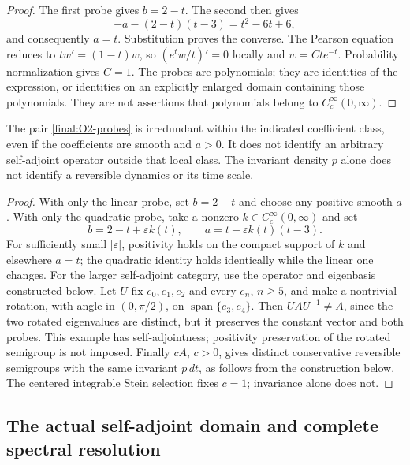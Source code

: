 \begin{proof}
The first probe gives $b=2-t$.  The second then gives
\[
 -a-(2-t)(t-3)=t^2-6t+6,
\]
and consequently $a=t$.  Substitution proves the converse.
The Pearson equation reduces to
$tw'=(1-t)w$, so $(e^t w/t)'=0$ locally and $w=Cte^{-t}$.
Probability normalization gives $C=1$.
The probes are polynomials; they are identities of the expression,
or identities on an explicitly enlarged domain containing those
polynomials.  They are not assertions that polynomials belong to
$C_c^\infty(0,\infty)$.
\end{proof}

\begin{proposition}
\label{final:O2-boundaries}
The pair \eqref{final:O2-probes} is irredundant within the indicated
coefficient class, even if the coefficients are smooth and $a>0$.
It does not identify an arbitrary self-adjoint operator outside that
local class.  The invariant density $p$ alone does not identify a
reversible dynamics or its time scale.
\end{proposition}

\begin{proof}
With only the linear probe, set $b=2-t$ and choose any positive smooth
$a$.  With only the quadratic probe, take a nonzero
$k\in C_c^\infty(0,\infty)$ and set
\[
 b=2-t+\varepsilon k(t),\qquad
 a=t-\varepsilon k(t)(t-3).
\]
For sufficiently small $|\varepsilon|$, positivity holds on the compact
support of $k$ and elsewhere $a=t$; the quadratic identity holds
identically while the linear one changes.
For the larger self-adjoint category, use the operator and eigenbasis
constructed below.  Let $U$ fix $e_0,e_1,e_2$ and every $e_n$, $n\geq5$,
and make a nontrivial rotation, with angle in $(0,\pi/2)$, on
$\operatorname{span}\{e_3,e_4\}$.  Then $UAU^{-1}\ne A$, since the
two rotated eigenvalues are distinct, but it preserves the constant
vector and both probes.  This example has self-adjointness; positivity
preservation of the rotated semigroup is not imposed.
Finally $cA$, $c>0$, gives distinct conservative reversible semigroups
with the same invariant $p\,dt$, as follows from the construction below.
The centered integrable Stein selection fixes $c=1$; invariance alone
does not.
\end{proof}

\subsection{The actual self-adjoint domain and complete spectral resolution}

